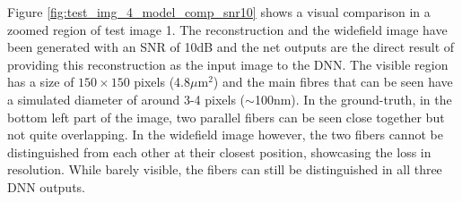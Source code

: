 \documentclass[conference]{IEEEtran}
\begin{document}
\begin{table}[h]
{    }
    \newline
    \vspace*{0.2 cm}
    \newline
    \tabcolsep=0.11cm
    \caption{Comparison of the 4-image SR-SIM reconstruction ("Reconstr."), Widefield, \textit{snrMIX}-, \textit{snrMIX2}- and \textit{snrMIX3} model with the ground-truth. The results are obtained by using test images 1, 2 and 3 with SNR values (5dB / 10dB / 15dB / 20dB) as the input image to the system.}
    \label{tab:results_comparison}
\end{table}

Figure \ref{fig:test_img_4_model_comp_snr10} shows a visual comparison in a zoomed region of test image 1. The reconstruction and the widefield image have been generated with an SNR of 10dB and the net outputs are the direct result of providing this reconstruction as the input image to the DNN. The visible region has a size of $150 \times 150$ pixels (4.8$\mu$m$^2$) and the main fibres that can be seen have a simulated diameter of around 3-4 pixels ($\sim$100nm). In the ground-truth, in the bottom left part of the image, two parallel fibers can be seen close together but not quite overlapping. In the widefield image however, the two fibers cannot be distinguished from each other at their closest position, showcasing the loss in resolution. While barely visible, the fibers can still be distinguished in all three DNN outputs.
\end{document}
